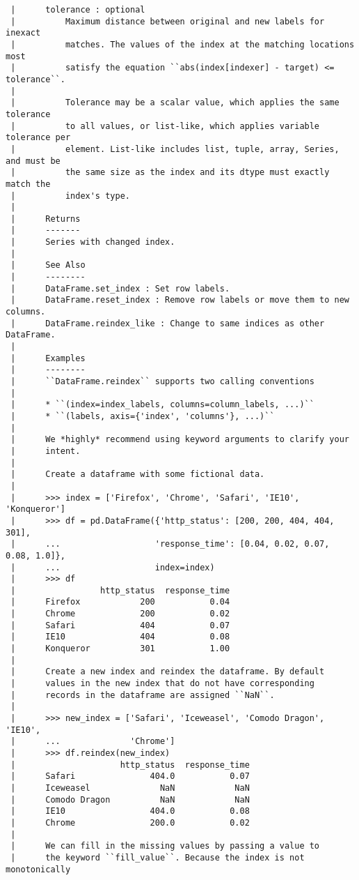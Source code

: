 \documentclass[
  letterpaper,
  DIV=11,
  numbers=noendperiod]{scrreprt}
\begin{document}
\begin{verbatim}
 |      tolerance : optional
 |          Maximum distance between original and new labels for inexact
 |          matches. The values of the index at the matching locations most
 |          satisfy the equation ``abs(index[indexer] - target) <= tolerance``.
 |      
 |          Tolerance may be a scalar value, which applies the same tolerance
 |          to all values, or list-like, which applies variable tolerance per
 |          element. List-like includes list, tuple, array, Series, and must be
 |          the same size as the index and its dtype must exactly match the
 |          index's type.
 |      
 |      Returns
 |      -------
 |      Series with changed index.
 |      
 |      See Also
 |      --------
 |      DataFrame.set_index : Set row labels.
 |      DataFrame.reset_index : Remove row labels or move them to new columns.
 |      DataFrame.reindex_like : Change to same indices as other DataFrame.
 |      
 |      Examples
 |      --------
 |      ``DataFrame.reindex`` supports two calling conventions
 |      
 |      * ``(index=index_labels, columns=column_labels, ...)``
 |      * ``(labels, axis={'index', 'columns'}, ...)``
 |      
 |      We *highly* recommend using keyword arguments to clarify your
 |      intent.
 |      
 |      Create a dataframe with some fictional data.
 |      
 |      >>> index = ['Firefox', 'Chrome', 'Safari', 'IE10', 'Konqueror']
 |      >>> df = pd.DataFrame({'http_status': [200, 200, 404, 404, 301],
 |      ...                   'response_time': [0.04, 0.02, 0.07, 0.08, 1.0]},
 |      ...                   index=index)
 |      >>> df
 |                 http_status  response_time
 |      Firefox            200           0.04
 |      Chrome             200           0.02
 |      Safari             404           0.07
 |      IE10               404           0.08
 |      Konqueror          301           1.00
 |      
 |      Create a new index and reindex the dataframe. By default
 |      values in the new index that do not have corresponding
 |      records in the dataframe are assigned ``NaN``.
 |      
 |      >>> new_index = ['Safari', 'Iceweasel', 'Comodo Dragon', 'IE10',
 |      ...              'Chrome']
 |      >>> df.reindex(new_index)
 |                     http_status  response_time
 |      Safari               404.0           0.07
 |      Iceweasel              NaN            NaN
 |      Comodo Dragon          NaN            NaN
 |      IE10                 404.0           0.08
 |      Chrome               200.0           0.02
 |      
 |      We can fill in the missing values by passing a value to
 |      the keyword ``fill_value``. Because the index is not monotonically

\end{verbatim}
\end{document}
